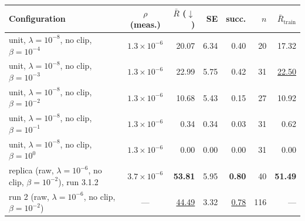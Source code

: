 \begin{tabular}{@{}l c r r r r r@{}}
\toprule
\textbf{Configuration} & \textbf{$\rho$ (meas.)} & \textbf{$\bar{R}$ ($\downarrow$)} & \textbf{SE} & \textbf{succ.} & \textbf{$n$} & \textbf{$\bar{R}_{\text{train}}$} \\
\midrule
unit, $\lambda{=}10^{-8}$, no clip, $\beta{=}10^{-4}$ & $1.3\times10^{-6}$ & 20.07 & 6.34 & 0.40 & 20 & 17.32 \\
unit, $\lambda{=}10^{-8}$, no clip, $\beta{=}10^{-3}$ & $1.3\times10^{-6}$ & 22.99 & 5.75 & 0.42 & 31 & \underline{22.50} \\
unit, $\lambda{=}10^{-8}$, no clip, $\beta{=}10^{-2}$ & $1.3\times10^{-6}$ & 10.68 & 5.43 & 0.15 & 27 & 10.92 \\
unit, $\lambda{=}10^{-8}$, no clip, $\beta{=}10^{-1}$ & $1.3\times10^{-6}$ & 0.34 & 0.34 & 0.03 & 31 & 0.62 \\
unit, $\lambda{=}10^{-8}$, no clip, $\beta{=}10^{0}$ & $1.3\times10^{-6}$ & 0.00 & 0.00 & 0.00 & 31 & 0.00 \\
\midrule
replica (raw, $\lambda{=}10^{-6}$, no clip, $\beta{=}10^{-2}$), run 3.1.2 & $3.7\times10^{-6}$ & \textbf{53.81} & 5.95 & \textbf{0.80} & 40 & \textbf{51.49} \\
run 2 (raw, $\lambda{=}10^{-6}$, no clip, $\beta{=}10^{-2}$) & --- & \underline{44.49} & 3.32 & \underline{0.78} & 116 & --- \\
\bottomrule
\end{tabular}
